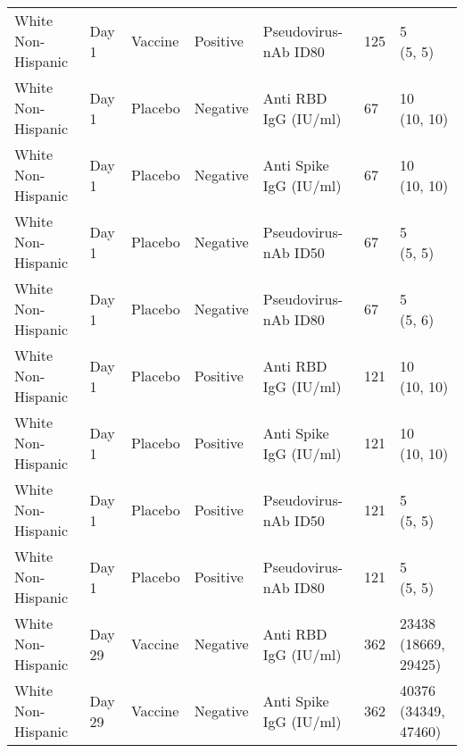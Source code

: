 \documentclass[]{book}
\theoremstyle{definition}
\theoremstyle{definition}
\theoremstyle{definition}
\newcommand{\1}{\mathbbm{1}}
\begin{document}
\begin{landscape}
\begin{ThreePartTable}
\begin{longtable}[t]{>{\raggedright\arraybackslash}p{7cm}llllll}
\hspace{1em}White Non-Hispanic & Day 1 & Vaccine & Positive & Pseudovirus-nAb ID80 & 125 & \makecell[l]{5\\(5, 5)}\\
\hspace{1em}White Non-Hispanic & Day 1 & Placebo & Negative & Anti RBD IgG (IU/ml) & 67 & \makecell[l]{10\\(10, 10)}\\
\hspace{1em}White Non-Hispanic & Day 1 & Placebo & Negative & Anti Spike IgG (IU/ml) & 67 & \makecell[l]{10\\(10, 10)}\\
\hspace{1em}White Non-Hispanic & Day 1 & Placebo & Negative & Pseudovirus-nAb ID50 & 67 & \makecell[l]{5\\(5, 5)}\\
\hspace{1em}White Non-Hispanic & Day 1 & Placebo & Negative & Pseudovirus-nAb ID80 & 67 & \makecell[l]{5\\(5, 6)}\\
\hspace{1em}White Non-Hispanic & Day 1 & Placebo & Positive & Anti RBD IgG (IU/ml) & 121 & \makecell[l]{10\\(10, 10)}\\
\hspace{1em}White Non-Hispanic & Day 1 & Placebo & Positive & Anti Spike IgG (IU/ml) & 121 & \makecell[l]{10\\(10, 10)}\\
\hspace{1em}White Non-Hispanic & Day 1 & Placebo & Positive & Pseudovirus-nAb ID50 & 121 & \makecell[l]{5\\(5, 5)}\\
\hspace{1em}White Non-Hispanic & Day 1 & Placebo & Positive & Pseudovirus-nAb ID80 & 121 & \makecell[l]{5\\(5, 5)}\\
\hspace{1em}White Non-Hispanic & Day 29 & Vaccine & Negative & Anti RBD IgG (IU/ml) & 362 & \makecell[l]{23438\\(18669, 29425)}\\
\hspace{1em}White Non-Hispanic & Day 29 & Vaccine & Negative & Anti Spike IgG (IU/ml) & 362 & \makecell[l]{40376\\(34349, 47460)}\\

\end{longtable}
\end{ThreePartTable}
\end{landscape}
\end{document}
